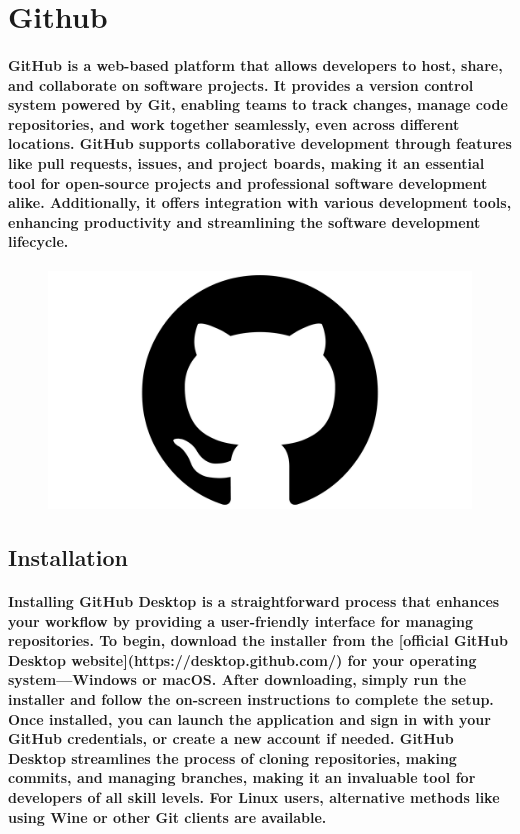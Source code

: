 \documentclass[12pt, a4paper]{article}
\begin{document}
\newpage

\usetikzlibrary{calc}


\section*{Github}
\paragraph{GitHub is a web-based platform that allows developers to host, share, and collaborate on software projects. It provides a version control system powered by Git, enabling teams to track changes, manage code repositories, and work together seamlessly, even across different locations. GitHub supports collaborative development through features like pull requests, issues, and project boards, making it an essential tool for open-source projects and professional software development alike. Additionally, it offers integration with various development tools, enhancing productivity and streamlining the software development lifecycle.}

\begin{figure}
    \centering
    \includegraphics[width=0.5\linewidth]{GitHub-Symbol.png}
\end{figure}
\subsection*{Installation}
\paragraph{Installing GitHub Desktop is a straightforward process that enhances your workflow by providing a user-friendly interface for managing repositories. To begin, download the installer from the [official GitHub Desktop website](https://desktop.github.com/) for your operating system—Windows or macOS. After downloading, simply run the installer and follow the on-screen instructions to complete the setup. Once installed, you can launch the application and sign in with your GitHub credentials, or create a new account if needed. GitHub Desktop streamlines the process of cloning repositories, making commits, and managing branches, making it an invaluable tool for developers of all skill levels. For Linux users, alternative methods like using Wine or other Git clients are available.}
\end{document}
